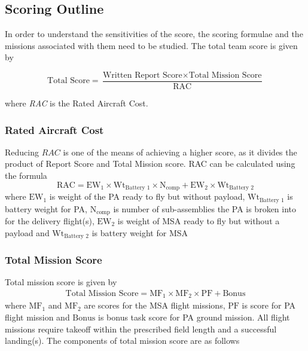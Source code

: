\subsection{Scoring Outline} \label{sec:scoring_outline}
In order to understand the sensitivities of the score, the scoring formulae and the missions associated with them need to be studied. The total team score is given by

\begin{equation}
\text{Total Score} = \frac{\text{Written Report Score} \times \text{Total Mission Score}}{\text{RAC}}
\end{equation}

where \textit{RAC} is the Rated Aircraft Cost. 
\subsubsection{Rated Aircraft Cost}
%
Reducing $RAC$ is one of the means of achieving a higher score, as it divides the product of Report Score and Total Mission score. RAC can be calculated using the formula
%
\begin{equation}
    \text{RAC} = \text{EW}_{1} \times \text{Wt}_{\textrm{Battery 1}} \times \text{N}_{\text{comp}} + \text{EW}_{2} \times \text{Wt}_{\textrm{Battery 2}}
\end{equation}
%
where $\text{EW}_{1}$ is weight of the PA ready to fly but without payload, $\text{Wt}_{\textrm{Battery 1}}$ is battery weight for PA, $\text{N}_{\text{comp}}$ is number of sub-assemblies the PA is broken into for the delivery flight(s), $\text{EW}_{2}$ is weight of MSA ready to fly but without a payload and $\text{Wt}_{\textrm{Battery 2}}$ is battery weight for MSA

\subsubsection{Total Mission Score}

Total mission score is given by
%
\begin{gather}
    \textrm{Total Mission Score} = \text{MF}_{1} \times \text{MF}_{2} \times \text{PF} + \textrm{Bonus}
\end{gather}
%
where $\text{MF}_{1}$ and $\text{MF}_{2}$ are scores for the MSA flight missions, $\text{PF}$ is score for PA flight mission and $\textrm{Bonus}$ is bonus task score for PA ground mission. All flight missions require takeoff within the prescribed field length and a successful landing(s). The components of total mission score are as follows

